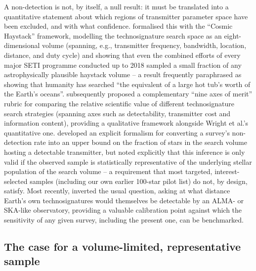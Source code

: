\documentclass{openjournal}
\begin{document}
A non-detection is not, by itself, a null result: it must be translated into a
quantitative statement about which regions of transmitter parameter space have
been excluded, and with what confidence. \citet{Wright2018} formalised this with
the ``Cosmic Haystack'' framework, modelling the technosignature search space as
an eight-dimensional volume (spanning, e.g., transmitter frequency, bandwidth,
location, distance, and duty cycle) and showing that even the combined efforts of
every major SETI programme conducted up to 2018 sampled a small fraction
of any astrophysically plausible haystack volume -- a result frequently
paraphrased as showing that humanity has searched ``the equivalent of a large
hot tub's worth of the Earth's oceans''. \citet{Sheikh2020} subsequently proposed
a complementary ``nine axes of merit'' rubric for comparing the relative
scientific value of different technosignature search strategies (spanning axes
such as detectability, transmitter cost and information content), providing a
qualitative framework alongside Wright et al.'s quantitative one.
\citet{Margot2023} developed an explicit formalism for converting a survey's
non-detection rate into an upper bound on the fraction of stars in the search
volume hosting a detectable transmitter, but noted explicitly that this
inference is only valid if the observed sample is statistically representative
of the underlying stellar population of the search volume -- a requirement that
most targeted, interest-selected samples (including our own earlier 100-star
pilot list) do not, by design, satisfy. Most recently, \citet{EarthDetectingEarth2025}
inverted the usual question, asking at what distance Earth's own technosignatures
would themselves be detectable by an ALMA- or SKA-like observatory, providing a
valuable calibration point against which the sensitivity of any given
survey, including the present one, can be benchmarked.

\subsection{The case for a volume-limited, representative sample}
\label{sec:volumelimited}
\end{document}
